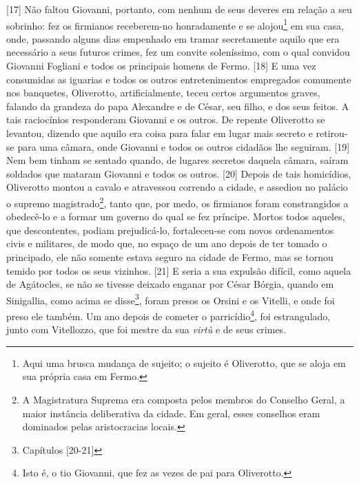{[}17{]} Não faltou Giovanni, portanto, com nenhum de seus deveres em
relação a seu sobrinho: fez os firmianos receberem-no honradamente e se
alojou\footnote{Aqui uma brusca mudança de sujeito; o sujeito é
  Oliverotto, que se aloja em sua própria casa em Fermo.} em sua casa,
onde, passando alguns dias empenhado em tramar secretamente aquilo que
era necessário a seus futuros crimes, fez um convite soleníssimo, com o
qual convidou Giovanni Fogliani e todos os principais homens de Fermo.
{[}18{]} E uma vez consumidas as iguarias e todos os outros
entretenimentos empregados comumente nos banquetes, Oliverotto,
artificialmente, teceu certos argumentos graves, falando da grandeza do
papa Alexandre e de César, seu filho, e dos seus feitos. A tais
raciocínios responderam Giovanni e os outros. De repente Oliverotto se
levantou, dizendo que aquilo era coisa para falar em lugar mais secreto
e retirou-se para uma câmara, onde Giovanni e todos os outros cidadãos
lhe seguiram. {[}19{]} Nem bem tinham se sentado quando, de lugares
secretos daquela câmara, saíram soldados que mataram Giovanni e todos os
outros. {[}20{]} Depois de tais homicídios, Oliverotto montou a cavalo e
atravessou correndo a cidade, e assediou no palácio o supremo
magistrado\footnote{A Magistratura Suprema era composta pelos membros do
  Conselho Geral, a maior instância deliberativa da cidade. Em geral,
  esses conselhos eram dominados pelas aristocracias locais.}, tanto
que, por medo, os firmianos foram constrangidos a obedecê-lo e a formar
um governo do qual se fez príncipe. Mortos todos aqueles, que
descontentes, podiam prejudicá-lo, fortaleceu-se com novos ordenamentos
civis e militares, de modo que, no espaço de um ano depois de ter tomado
o principado, ele não somente estava seguro na cidade de Fermo, mas se
tornou temido por todos os seus vizinhos. {[}21{]} E seria a sua
expulsão difícil, como aquela de Agátocles, se não se tivesse deixado
enganar por César Bórgia, quando em Sinigallia, como acima se
disse\footnote{Capítulos  {[}20-21{]}}, foram presos os Orsini e os
Vitelli, e onde foi preso ele também. Um ano depois de cometer o
parricídio\footnote{Isto é, o tio Giovanni, que fez as vezes de pai para
  Oliverotto.}, foi estrangulado, junto com Vitellozzo, que foi mestre
da sua \emph{virtù} e de seus crimes.

